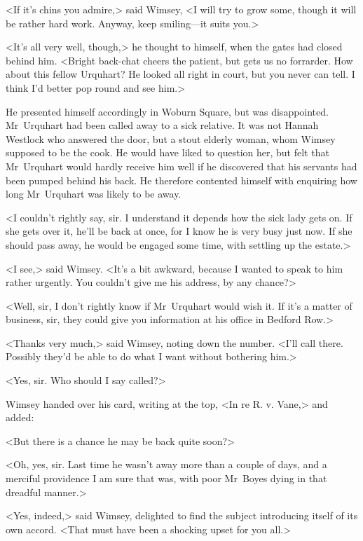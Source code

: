 <If it's chins you admire,> said Wimsey, <I will try to grow some, though it will be rather hard work. Anyway, keep smiling—it suits you.>

\divider

<It's all very well, though,> he thought to himself, when the gates had closed behind him. <Bright back-chat cheers the patient, but gets us no forrarder. How about this fellow Urquhart? He looked all right in court, but you never can tell. I think I'd better pop round and see him.>

He presented himself accordingly in Woburn Square, but was disappointed. Mr~Urquhart had been called away to a sick relative. It was not Hannah Westlock who answered the door, but a stout elderly woman, whom Wimsey supposed to be the cook. He would have liked to question her, but felt that Mr~Urquhart would hardly receive him well if he discovered that his servants had been pumped behind his back. He therefore contented himself with enquiring how long Mr~Urquhart was likely to be away.

<I couldn't rightly say, sir. I understand it depends how the sick lady gets on. If she gets over it, he'll be back at once, for I know he is very busy just now. If she should pass away, he would be engaged some time, with settling up the estate.>

<I see,> said Wimsey. <It's a bit awkward, because I wanted to speak to him rather urgently. You couldn't give me his address, by any chance?>

<Well, sir, I don't rightly know if Mr~Urquhart would wish it. If it's a matter of business, sir, they could give you information at his office in Bedford Row.>

<Thanks very much,> said Wimsey, noting down the number. <I'll call there. Possibly they'd be able to do what I want without bothering him.>

<Yes, sir. Who should I say called?>

Wimsey handed over his card, writing at the top, <In re R. v. Vane,> and added:

<But there is a chance he may be back quite soon?>

<Oh, yes, sir. Last time he wasn't away more than a couple of days, and a merciful providence I am sure that was, with poor Mr~Boyes dying in that dreadful manner.>

<Yes, indeed,> said Wimsey, delighted to find the subject introducing itself of its own accord. <That must have been a shocking upset for you all.>

